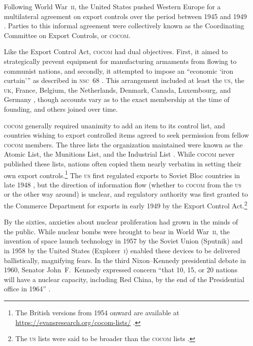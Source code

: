 \documentclass[12pt]{olfmemo}
\begin{document}
Following World War~\textsc{ii}, the United States pushed Western Europe for a multilateral agreement on export controls over the period between 1945 and 1949 \citep{Yasuhara1991}. Parties to this informal agreement were collectively known as the Coordinating Committee on Export Controls, or \textsc{cocom}.

Like the Export Control Act, \textsc{cocom} had dual objectives. First, it aimed to strategically prevent equipment for manufacturing armaments from flowing to communist nations, and secondly, it attempted to impose an ``economic `iron curtain''' as described in \textsc{nsc}~68 \citep{NSC68}. This arrangement included at least the \textsc{us}, the \textsc{uk}, France, Belgium, the Netherlands, Denmark, Canada, Luxembourg, and Germany \citep{Yasuhara1991}, though accounts vary as to the exact membership at the time of founding, and others joined over time.

\textsc{cocom} generally required unanimity to add an item to its control list, and countries wishing to export controlled items agreed to seek permission from fellow \textsc{cocom} members. The three lists the organization maintained were known as the Atomic List, the Munitions List, and the Industrial List \citep{Evans2014}. While \textsc{cocom} never published these lists, nations often copied them nearly verbatim in setting their own export controls.\footnote{The British versions from 1954 onward are available at \url{https://evansresearch.org/cocom-lists/} \citep{Evans2015}.} The \textsc{us} first regulated exports to Soviet Bloc countries in late 1948 \citep{Aoi2016}, but the direction of information flow (whether to \textsc{cocom} from the \textsc{us} or the other way around) is unclear, and regulatory authority was first granted to the Commerce Department for exports in early 1949 by the Export Control Act.\footnote{The \textsc{us} lists were said to be broader than the \textsc{cocom} lists \citep{NAP1987}.} %

By the sixties, anxieties about nuclear proliferation had grown in the minds of the public. While nuclear bombs were brought to bear in World War~\textsc{ii}, the invention of space launch technology in 1957 by the Soviet Union (Sputnik) and in 1958 by the United States (Explorer~\textsc{i}) enabled these devices to be delivered ballistically, magnifying fears. In the third Nixon--Kennedy presidential debate in 1960, Senator John~F.~Kennedy expressed concern ``that 10, 15, or 20 nations will have a nuclear capacity, including Red China, by the end of the Presidential office in 1964'' \citep{NixonKennedy3rd1960}.
\end{document}
